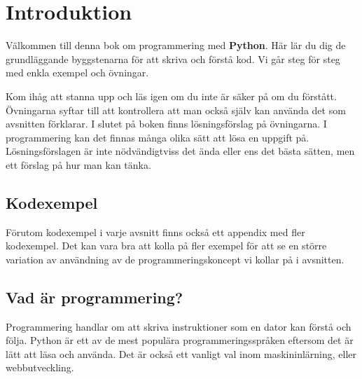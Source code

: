 
\chapter{Introduktion}
\label{chapter:intro}
Välkommen till denna bok om programmering med \textbf{Python}. Här lär du dig de grundläggande byggstenarna för att skriva och förstå kod. Vi går steg för steg med enkla exempel och övningar. 

Kom ihåg att stanna upp och läs igen om du inte är säker på om du förstått. 
Övningarna syftar till att kontrollera att man också själv kan använda det som avsnitten förklarar. 
I slutet på boken finns lösningsförslag på övningarna. 
I programmering kan det finnas många olika sätt att lösa en uppgift på. 
Lösningsförslagen är inte nödvändigtviss det ända eller ens det bästa sätten, men ett förslag på hur man kan tänka. 

\section{Kodexempel}
Förutom kodexempel i varje avsnitt finns också ett appendix med fler kodexempel.
Det kan vara bra att kolla på fler exempel för att se en större variation av användning av de programmeringskoncept vi kollar på i avsnitten.

\section{Vad är programmering?}
Programmering handlar om att skriva instruktioner som en dator kan förstå och följa. Python är ett av de mest populära programmeringsspråken eftersom det är lätt att läsa och använda. Det är också ett vanligt val inom maskininlärning, eller webbutveckling. 


